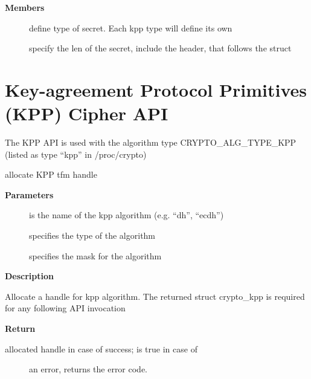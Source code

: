 \documentclass[a4paper,8pt,english]{sphinxmanual}
\begin{document}
\textbf{Members}
\begin{description}
\item[{}] \leavevmode
define type of secret. Each kpp type will define its own

\item[{}] \leavevmode
specify the len of the secret, include the header, that
follows the struct

\end{description}


\section{Key-agreement Protocol Primitives (KPP) Cipher API}
\label{crypto/api-kpp:key-agreement-protocol-primitives-kpp-cipher-api}
The KPP API is used with the algorithm type
CRYPTO\_ALG\_TYPE\_KPP (listed as type ``kpp'' in /proc/crypto)

\begin{fulllineitems}
\label{crypto/api-kpp:c.crypto_alloc_kpp}
allocate KPP tfm handle

\end{fulllineitems}


\textbf{Parameters}
\begin{description}
\item[{}] \leavevmode
is the name of the kpp algorithm (e.g. ``dh'', ``ecdh'')

\item[{}] \leavevmode
specifies the type of the algorithm

\item[{}] \leavevmode
specifies the mask for the algorithm

\end{description}

\textbf{Description}

Allocate a handle for kpp algorithm. The returned struct crypto\_kpp
is required for any following API invocation

\textbf{Return}
\begin{description}
\item[{allocated handle in case of success;  is true in case of}] \leavevmode
an error,  returns the error code.

\end{description}
\end{document}
